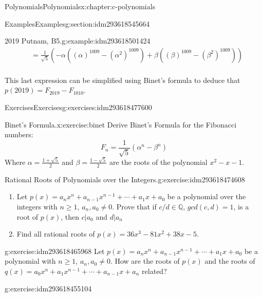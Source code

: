 \documentclass[twoside,10pt,]{book}
\numberwithin{equation}{section}
\begin{document}
\begin{chapterptx}{Polynomials}{}{Polynomials}{}{}{x:chapter:c-polynomials}
\begin{sectionptx}{Examples}{}{Examples}{}{}{g:section:idm293618545664}
\begin{example}{2019 Putnam, B5.}{g:example:idm293618501424}
\begin{equation*}
\begin{split}
&=\frac{1}{\sqrt{5}}\left(-\alpha((\alpha)^{1009} -(\alpha^2)^{1009} )
+\beta  ((\beta)^{1009} -(\beta^2)^{1009} )
\right)\\                       
\end{split}
\end{equation*}
%
\par
This last expression can be simplified using Binet's formula to deduce that \(p(2019) = F_{2019} - F_{1010}\).%
\end{example}
\end{sectionptx}
%
%
\typeout{************************************************}
\typeout{************************************************}
%
\begin{exercises-section}{Exercises}{}{Exercises}{}{}{g:exercises:idm293618477600}
\begin{divisionexercise}{1}{Binet's Formula.}{}{x:exercise:binet}%
%
Derive Binet's Formula for the Fibonacci numbers:%
\begin{equation*}
F_n=\frac{1}{\sqrt{5}}(\alpha^{n}-\beta^{n})
\end{equation*}
Where \(\alpha=\frac{1+\sqrt{5}}{2}\) and \(\beta=\frac{1-\sqrt{5}}{2}\) are the roots of the polynomial \(x^2-x-1\).%
\end{divisionexercise}%
\begin{divisionexercise}{2}{Rational Roots of Polynomials over the Integers.}{}{g:exercise:idm293618474608}%
%
\begin{enumerate}[label=(\alph*)]
\item{}Let \(p(x)= a_n x^n + a_{n-1}x^{n-1}+ \cdots +a_1 x + a_0\) be a polynomial over the integers with \(n\geq 1\), \(a_n, a_0 \neq 0\).  Prove that if \(c/d \in \mathbb{Q}\), \(gcd(c,d)=1\), is a root of \(p(x)\), then  \(c \vert a_0\) and \(d \vert a_n\)%
\item{}Find all rational roots of \(p(x)=36 x^3-81 x^2+38 x-5\).%
\end{enumerate}
%
\end{divisionexercise}%
\begin{divisionexercise}{3}{}{}{g:exercise:idm293618465968}%
Let \(p(x)= a_n x^n + a_{n-1}x^{n-1}+ \cdots +a_1 x + a_0\) be a polynomial with \(n\geq 1\), \(a_n, a_0 \neq 0\). How are the roots of \(p(x)\) and the roots of  \(q(x)= a_0 x^n + a_1 x^{n-1}+ \cdots +a_{n-1} x + a_n\) related?%
\end{divisionexercise}%
\begin{divisionexercise}{4}{}{}{g:exercise:idm293618455104}%

\end{divisionexercise}
\end{exercises-section}
\end{chapterptx}
\end{document}
